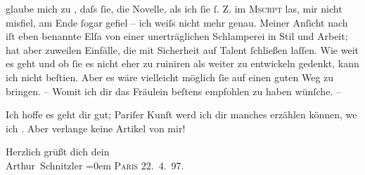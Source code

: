                glaube mich zu \label{K_L00668-3v}\label{K_L00668-3}, daſs{ }ſie, die Novelle, als ich{ }ſie{ }ſ. Z. im \textsc{Mscrpt}
               las, mir nicht {\pb}misfiel, am Ende{ }ſogar gefiel – ich weiſs nicht mehr genau. Meiner Anſicht nach iſt
               eben benannte Elſa von einer unerträglichen
               Schlamperei in Stil und Arbeit; hat aber zuweilen Einfälle, die mit Sicherheit auf
               Talent{ }ſchließen laſſen. Wie weit es geht und ob{ }ſie es nicht eher {\pb}\introOben{}zu\introOben{} ruiniren als weiter zu entwickeln gedenkt, kann ich
               nicht beſti{\geminationm}en. Aber es wäre vielleicht möglich{ }ſie auf
               einen guten Weg zu bringen. – Womit ich dir das Fräulein beſtens empfohlen zu haben
               wünſche. –\pend
           
\pstart
           Ich hoffe es geht dir gut; Pariſer Kunſt {\pb}werd ich dir manches
               erzählen können, we{\geminationn} ich \label{K_L00668-4v}\label{K_L00668-4}. Aber verlange keine Artikel von mir!\pend
           
\pstart
           Herzlich grüßt dich dein{\\[\baselineskip]}\spacefill\mbox{Arthur Schnitzler}\pend
           \leftskip=0em{}
\pstart
           \textsc{Paris}{ }22. 4. 97.\pend
           \endnumbering{}  \newcommand{\dateiname}{L00668}\newcommand{\titel}{Arthur Schnitzler an Hermann Bahr, 22. 4. 1897}\newcommand{\editorInnen}{Herausgegeben von Martin Anton Müller}

